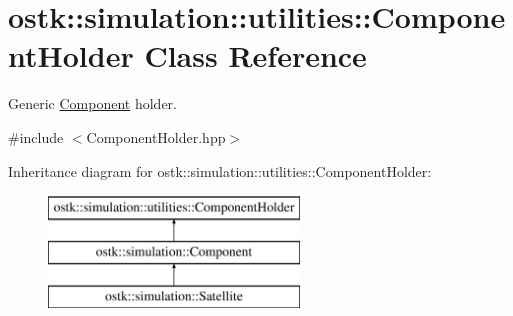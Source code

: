 \hypertarget{classostk_1_1simulation_1_1utilities_1_1_component_holder}{}\section{ostk\+:\+:simulation\+:\+:utilities\+:\+:Component\+Holder Class Reference}
\label{classostk_1_1simulation_1_1utilities_1_1_component_holder}


Generic \hyperlink{classostk_1_1simulation_1_1_component}{Component} holder.  




{\ttfamily \#include $<$Component\+Holder.\+hpp$>$}

Inheritance diagram for ostk\+:\+:simulation\+:\+:utilities\+:\+:Component\+Holder\+:\begin{figure}[H]
\begin{center}
\leavevmode
\includegraphics[height=3.000000cm]{classostk_1_1simulation_1_1utilities_1_1_component_holder}
\end{center}
\end{figure}
